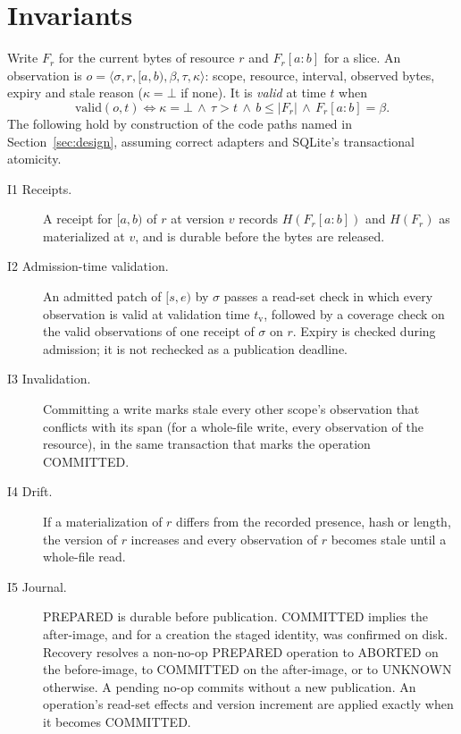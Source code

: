 \documentclass[10pt]{article}
\begin{document}
\section{Invariants}\label{sec:invariants}

Write $F_r$ for the current bytes of resource $r$ and $F_r[a{:}b]$ for a slice. An observation is $o=\langle\sigma,r,[a,b),\beta,\tau,\kappa\rangle$: scope, resource, interval, observed bytes, expiry and stale reason ($\kappa=\bot$ if none). It is \emph{valid} at time $t$ when
\[
\mathrm{valid}(o,t) \iff \kappa=\bot \,\wedge\, \tau>t \,\wedge\, b\le|F_r| \,\wedge\, F_r[a{:}b]=\beta .
\]
The following hold by construction of the code paths named in Section~\ref{sec:design}, assuming correct adapters and SQLite's transactional atomicity.

\begin{description}
\item[I1 Receipts.] A receipt for $[a,b)$ of $r$ at version $v$ records $H(F_r[a{:}b])$ and $H(F_r)$ as materialized at $v$, and is durable before the bytes are released.
\item[I2 Admission-time validation.] An admitted patch of $[s,e)$ by $\sigma$ passes a read-set check in which every observation is valid at validation time $t_{\mathrm v}$, followed by a coverage check on the valid observations of one receipt of $\sigma$ on $r$. Expiry is checked during admission; it is not rechecked as a publication deadline.
\item[I3 Invalidation.] Committing a write marks stale every other scope's observation that conflicts with its span (for a whole-file write, every observation of the resource), in the same transaction that marks the operation COMMITTED.
\item[I4 Drift.] If a materialization of $r$ differs from the recorded presence, hash or length, the version of $r$ increases and every observation of $r$ becomes stale until a whole-file read.
\item[I5 Journal.] PREPARED is durable before publication. COMMITTED implies the after-image, and for a creation the staged identity, was confirmed on disk. Recovery resolves a non-no-op PREPARED operation to ABORTED on the before-image, to COMMITTED on the after-image, or to UNKNOWN otherwise. A pending no-op commits without a new publication. An operation's read-set effects and version increment are applied exactly when it becomes COMMITTED.
\end{description}
\end{document}
